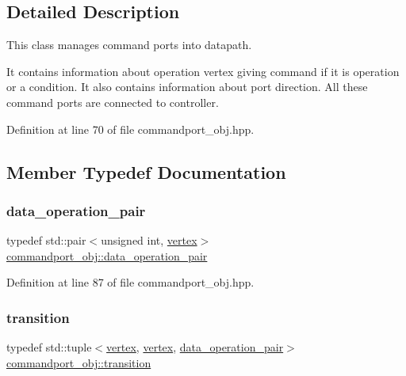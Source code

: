\subsection{Detailed Description}
This class manages command ports into datapath. 

It contains information about operation vertex giving command if it is operation or a condition. It also contains information about port direction. All these command ports are connected to controller. 

Definition at line 70 of file commandport\+\_\+obj.\+hpp.



\subsection{Member Typedef Documentation}
\mbox{\label{classcommandport__obj_a469b1d6eb72e39848c242838513d742b}} 
\subsubsection{\texorpdfstring{data\+\_\+operation\+\_\+pair}{data\_operation\_pair}}
{\footnotesize\ttfamily typedef std\+::pair$<$unsigned int, \hyperlink{graph_8hpp_abefdcf0544e601805af44eca032cca14}{vertex}$>$ \hyperlink{classcommandport__obj_a469b1d6eb72e39848c242838513d742b}{commandport\+\_\+obj\+::data\+\_\+operation\+\_\+pair}}



Definition at line 87 of file commandport\+\_\+obj.\+hpp.

\mbox{\label{classcommandport__obj_aae52b929cff6d84d461b91d88baa3203}} 
\subsubsection{\texorpdfstring{transition}{transition}}
{\footnotesize\ttfamily typedef std\+::tuple$<$\hyperlink{graph_8hpp_abefdcf0544e601805af44eca032cca14}{vertex}, \hyperlink{graph_8hpp_abefdcf0544e601805af44eca032cca14}{vertex}, \hyperlink{classcommandport__obj_a469b1d6eb72e39848c242838513d742b}{data\+\_\+operation\+\_\+pair}$>$ \hyperlink{classcommandport__obj_aae52b929cff6d84d461b91d88baa3203}{commandport\+\_\+obj\+::transition}}



